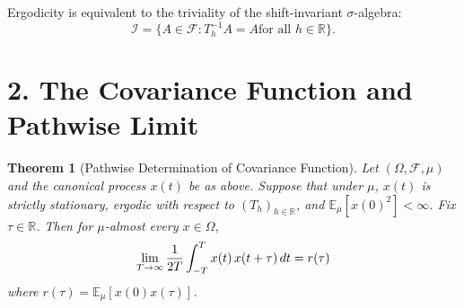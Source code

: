 \documentclass{article}
\newtheorem{theorem}{Theorem}
\begin{document}
\begin{remark}
  Ergodicity is equivalent to the triviality of the shift-invariant
  $\sigma$-algebra:
  \[ \mathcal{I}= \{A \in \mathcal{F}: T_h^{- 1} A = A \text{for all } h \in
     \mathbb{R}\} . \]
\end{remark}

\section*{2. The Covariance Function and Pathwise Limit}

\begin{theorem}
  [Pathwise Determination of Covariance Function]\label{mainthm}Let $(\Omega,
  \mathcal{F}, \mu)$ and the canonical process $x (t)$ be as above. Suppose
  that under $\mu$, $x (t)$ is strictly stationary, ergodic with respect to
  $(T_h)_{h \in \mathbb{R}}$, and $\mathbb{E}_{\mu} [x (0)^2] < \infty$. Fix
  $\tau \in \mathbb{R}$. Then for $\mu$-almost every $x \in \Omega$,
  \[ \lim_{T \to \infty}  \frac{1}{2 T}  \int_{- T}^T x (t)  \hspace{0.17em} x
     (t + \tau)  \hspace{0.17em} dt = r (\tau) \]
  where $r (\tau) =\mathbb{E}_{\mu}  [x (0) x (\tau)]$.
\end{theorem}
\end{document}
